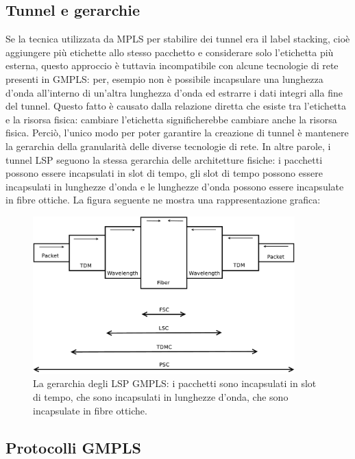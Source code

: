 \documentclass[10pt,a4paper]{report}
\begin{document}
\subsection*{Tunnel e gerarchie}

Se la tecnica utilizzata da MPLS per stabilire dei tunnel era il label
stacking, cioè aggiungere più etichette allo stesso pacchetto e
considerare solo l'etichetta più esterna, questo approccio è tuttavia
incompatibile con alcune tecnologie di rete presenti in GMPLS: per,
esempio non è possibile incapsulare una lunghezza d'onda all'interno
di un'altra lunghezza d'onda ed estrarre i dati integri alla fine del
tunnel. Questo fatto è causato dalla relazione diretta che esiste tra
l'etichetta e la risorsa fisica: cambiare l'etichetta significherebbe
cambiare anche la risorsa fisica. Perciò, l'unico modo per poter
garantire la creazione di tunnel è mantenere la gerarchia della
granularità delle diverse tecnologie di rete. In altre parole, i
tunnel LSP seguono la stessa gerarchia delle architetture fisiche: i
pacchetti possono essere incapsulati in slot di tempo, gli slot di
tempo possono essere incapsulati in lunghezze d'onda e le lunghezze
d'onda possono essere incapsulate in fibre ottiche. La figura seguente
ne mostra una rappresentazione grafica:\\

\begin{figure}[!htbp]
  \centering
  \includegraphics[width=0.9\textwidth]{img/gmpls_hierarchy}
  \caption[]{La gerarchia degli LSP GMPLS: i pacchetti sono
    incapsulati in slot di tempo, che sono incapsulati in lunghezze
    d'onda, che sono incapsulate in fibre ottiche.}
\end{figure}

\subsection*{Protocolli GMPLS}
\end{document}
